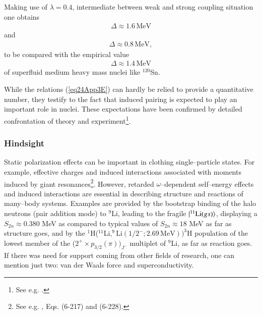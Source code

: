 \begin{subappendices}
Making use of $\lambda=0.4$, intermediate between weak and strong coupling situation one obtains
\begin{align}
\Delta\approx1.6\,\text{MeV}
\end{align}
and
\begin{align}
\Delta\approx0.8\,\text{MeV},
\end{align}
to be compared with the empirical value
\begin{align}
\Delta\approx1.4\,\text{MeV}
\end{align}
of superfluid medium heavy mass nuclei like $^{120}$Sn.

While the relations (\ref{eq24App3E}) can hardly be relied to provide a quantitative number, they testify to the fact that induced pairing is expected to play an important role in nuclei. These expectations have been confirmed by detailed confrontation of theory and experiment\footnote{See e.g. \cite{Idini:15}.}.
\subsubsection{Hindsight}
Static polarization effects can be important in clothing single--particle states. For example, effective charges  and induced interactions associated with moments induced by giant resonances\footnote{See e.g. \cite{Bohr:75}, Eqs. (6-217) and (6-228).}. However, retarded $\omega$--dependent self--energy effects and induced interactions are essential in describing structure and reactions of many--body systems. Examples are provided by the bootstrap binding of the halo neutrons (pair addition mode) to $^9$Li, leading to the fragile $|{^{11}\text{Li}(gs)} \rangle$, displaying a $S_{2n}\approx0.380$ MeV as compared to typical values of $S_{2n}\approx18$ MeV as far as structure goes, and by the $^1$H($^{11}\text{Li},^9\text{Li}(1/2^-;2.69\,\text{MeV}))^3$H population of the lowest member of the ($2^+\times p_{3/2}(\pi))_{J^-}$ multiplet of $^9$Li, as far as reaction goes.
If there was need for support coming from other fields of research, one can mention just two: van der Waals force and superconductivity.



\end{subappendices}
